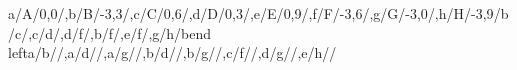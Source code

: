\begin{compatibilitygraph}{a/A/{0,0}/,b/B/{-3,3}/,c/C/{0,6}/,d/D/{0,3}/,e/E/{0,9}/,f/F/{-3,6}/,g/G/{-3,0}/,h/H/{-3,9}/}{b/c/,c/d/,d/f/,b/f/,e/f/,g/h/bend left}{a/b//,a/d//,a/g//,b/d//,b/g//,c/f//,d/g//,e/h//}{}{}
\end{compatibilitygraph}